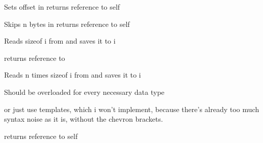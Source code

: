 \documentclass[letterpaper,10pt,english]{sphinxmanual}
\begin{document}

\begin{fulllineitems}
\label{header_handler:header_handler::offset__unsigned-i}
Sets offset in {\hyperref[header_handler:header_handler::file__std::ifstreamP]{}}
returns reference to self

\end{fulllineitems}


\begin{fulllineitems}
\label{header_handler:header_handler::skip__unsigned-i}
Skips n bytes in {\hyperref[header_handler:header_handler::file__std::ifstreamP]{}}
returns reference to self

\end{fulllineitems}


\begin{fulllineitems}
\label{header_handler:header_handler::read__typeR}
Reads sizeof i from {\hyperref[header_handler:header_handler::file__std::ifstreamP]{}} and saves it to i

returns reference to {\hyperref[header_handler:header_handler]{}}

\end{fulllineitems}


\begin{fulllineitems}
\label{header_handler:header_handler::read__typeR.unsigned-i}
Reads n times sizeof i from {\hyperref[header_handler:header_handler::file__std::ifstreamP]{}} and saves it to i

Should be overloaded for every necessary data type

or just use templates, which i won't implement, because there's already
too much syntax noise as it is, without the chevron brackets.

returns reference to self

\end{fulllineitems}
\end{document}
